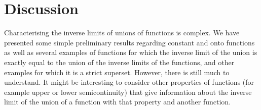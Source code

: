 \documentclass{article}
\theoremstyle{definition}
\begin{document}
\section{Discussion}

Characterising the inverse limits of unions of functions is complex.
We have presented some simple preliminary results regarding constant
and onto functions as well as several examples of functions for which
the inverse limit of the union is exactly equal to the union of the
inverse limits of the functions, and other examples for which it is a
strict superset.  However, there is still much to understand.  It
might be interesting to consider other properties of functions (for
example upper or lower semicontinuity) that give information about the
inverse limit of the union of a function with that property and
another function.



\end{document}
